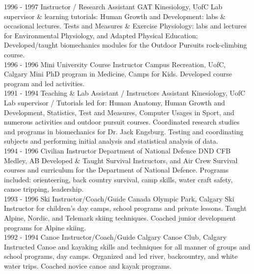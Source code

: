 \documentclass[]{friggeri-cv}
\begin{document}
\begin{entrylist}
     \entry
    {1996 - 1997}
    {Instructor / Research Assistant {GAT}}
    {Kinesiology, UofC}
    {Lab supervisor \& learning tutorials: Human Growth and Development: labs \& occasional lectures. Tests and Measures \& Exercise Physiology: labs and lectures for Environmental Physiology, and Adapted Physical Education; Developed/taught biomechanics modules for the Outdoor Pursuits rock-climbing course. \\}
     \entry
    {1996 - 1996}
    {Mini University Course Instructor}
    {Campus Recreation, UofC, Calgary}
    {Mini PhD program in Medicine, Camps for Kids. Developed course program and led activities.\\}
    \entry
    {1991 - 1994}
    {Teaching \& Lab Assistant / Instructors Assistant}
    {Kinesiology, UofC}
    {Lab supervisor / Tutorials led for: Human Anatomy, Human Growth and Development, Statistics, Test and Measures, Computer Usages in Sport, and numerous activities and outdoor pursuit courses. Coordinated research studies and programs in biomechanics for Dr. Jack Engsburg. Testing and coordinating subjects and performing initial analysis and statistical analysis of data.\\}
    \entry
    {1994 - 1996}
    {Civilian Instructor Department of National Defence }
    {DND CFB Medley, AB}
    {Developed \& Taught Survival Instructors, and Air Crew Survival courses and curriculum for the Department of National Defence. Programs included: orienteering, back country survival, camp skills, water craft safety, canoe tripping, leadership.\\ }
     \entry
    {1993 - 1996}
    {Ski Instructor/Coach/Guide}
    {Canada Olympic Park, Calgary}
    {Ski Instructor for children's day camps, school programs and private lessons. Taught Alpine, Nordic, and Telemark skiing techniques.  Coached junior development programs for Alpine skiing.\\}
     \entry
    {1992 - 1994}
    {Canoe Instructor/Coach/Guide}
    {Calgary Canoe Club, Calgary}
    {Instructed Canoe and kayaking skills and techniques for all manner of groups and school programs, day camps. Organized and led river, backcountry, and white water trips. Coached novice canoe and kayak programs.\\}

\end{entrylist}
\end{document}
